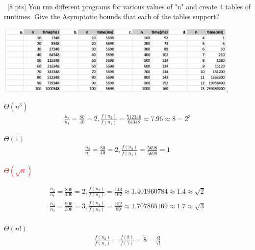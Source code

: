 \documentclass[12pt]{article}
\newenvironment{sol}[1][Solution]{\begin{trivlist}\item[\hskip\labelsep {\bfseries #1:}]}{\end{trivlist}}
\begin{document}
\begin{enumerate}
    \item \ [8 pts] You run different programs for various values of "n" and create 4 tables of runtimes. Give the Asymptotic bounds that each of the tables support?
    \begin{center}
        \includegraphics[width=0.9\textwidth]{p1.png}.
    \end{center}
    \begin{sol}
    \begin{enumerate}
        \item $\Theta(n^3)$
        \begin{align*}
            \frac{n_2}{n_1}=\frac{80}{40} = 2, \frac{f(n_2)}{f(n_1)}=\frac{512346}{64348} \approx 7.96 \approx 8 = 2^3
        \end{align*}

        \item $\Theta(1)$
        \begin{align*}
            \frac{n_2}{n_1} = \frac{80}{40} = 2, \frac{f(n_2)}{f(n_1)}=\frac{5698}{5698} = 1
        \end{align*}

        \textcolor{red}{\item $\Theta(\sqrt{n})$}
        \begin{align*}
            \frac{n_2}{n_1} = \frac{800}{400} = 2, \frac{f(n_2)}{f(n_1)}=\frac{143}{102} \approx 1.401960784 \approx 1.4 \approx \sqrt{2}\\
            \frac{n_4}{n_3} = \frac{900}{300} = 3, \frac{f(n_4)}{f(n_3)}=\frac{152}{89} \approx 1.707865169 \approx 1.7 \approx \sqrt{3} \\
        \end{align*}

        \item $\Theta(n!)$
        \begin{align*}
        \frac{f(n_2)}{f(n_1)}=\frac{f(8)}{f(7)} = 8 = \frac{8!}{7!}
        \end{align*}
    \end{enumerate}
    \end{sol}


\end{enumerate}
\end{document}
